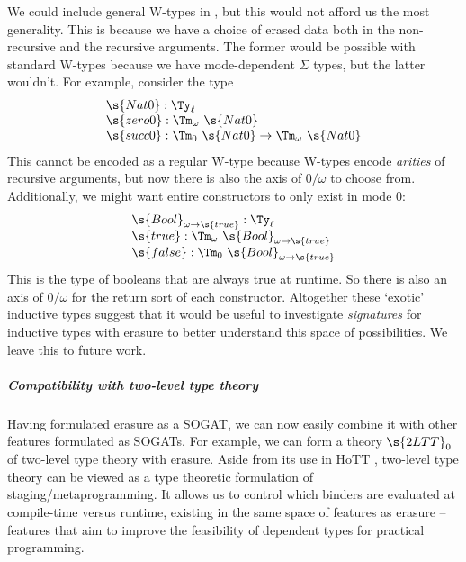 We could include general W-types \cite{Hugunin2021-ui} in \ZTT, but this would
not afford us the most generality. This is because we have a choice of erased
data both in the non-recursive and the recursive arguments. The former would be
possible with standard W-types because we have mode-dependent $\Sigma$ types,
but the latter wouldn't. For example, consider the type
\[
\begin{array}{l}
  \s{Nat0} : \Ty_\ell \\
  \s{zero0} : \Tm_\omega\ \s{Nat0} \\
  \s{succ0} : \Tm_0\ \s{Nat0} \to \Tm_\omega\ \s{Nat0} \\
\end{array}\]
This cannot be encoded as a regular W-type because W-types encode \emph{arities}
of recursive arguments, but now there is also the axis of $0/\omega$ to choose
from. Additionally, we might want entire constructors to only exist in mode 0:
\[
\begin{array}{l}
  \s{Bool}_{\omega\to \s{true}} : \Ty_\ell \\
  \s{true} : \Tm_\omega\ \s{Bool}_{\omega\to \s{true}} \\
  \s{false} : \Tm_0\ \s{Bool}_{\omega\to \s{true}} \\
\end{array}\]
This is the type of booleans that are always true at runtime. So there is also
an axis of $0/\omega$ for the return sort of each constructor. Altogether these
`exotic' inductive types suggest that it would be useful to investigate
\emph{signatures} for inductive types with erasure to better understand this
space of possibilities. We leave this to future work.

\subparagraph{Compatibility with two-level type theory}\label{ssub:2ltt}

Having formulated erasure as a SOGAT, we can now easily combine it with other
features formulated as SOGATs. For example, we can form a theory $\s{2LTT}_0$ of
two-level type theory \cite{Kovacs2022-rf} with erasure. Aside from its use in
HoTT \cite{Annenkov2023-vk}, two-level type theory can be viewed as a type
theoretic formulation of staging/metaprogramming. It allows us to control which
binders are evaluated at compile-time versus runtime, existing in the same space
of features as erasure -- features that aim to improve the feasibility of
dependent types for practical programming.


